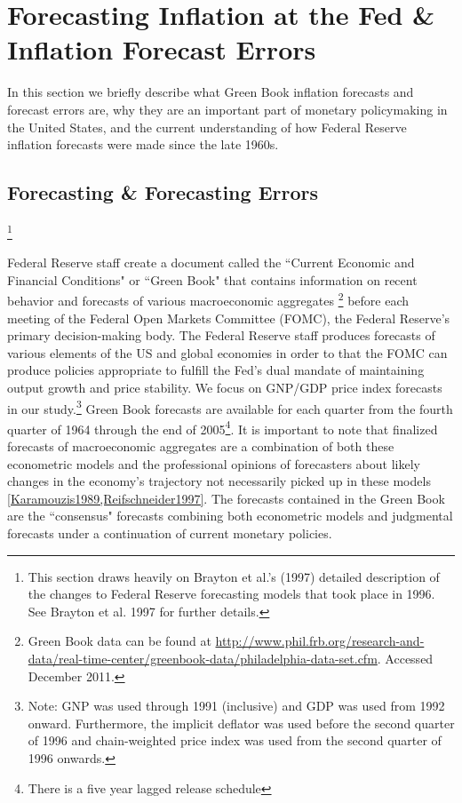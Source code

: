 \documentclass[a4paper]{article}\usepackage{graphicx, color}
\begin{document}

\section{Forecasting Inflation at the Fed \& Inflation Forecast Errors}

In this section we briefly describe what Green Book inflation forecasts and forecast errors are, why they are an important part of monetary policymaking in the United States, and the current understanding of how Federal Reserve inflation forecasts were made since the late 1960s.

\subsection{Forecasting \& Forecasting Errors}\footnote{This section draws heavily on Brayton et al.'s\nocite{Brayton1997} (1997) detailed description of the changes to Federal Reserve forecasting models that took place in 1996. See Brayton et al. 1997 for further details.}

Federal Reserve staff create a document called the ``Current Economic and Financial Conditions" or ``Green Book" that contains information on recent behavior and forecasts of various macroeconomic aggregates \footnote{Green Book data can be found at {\url{http://www.phil.frb.org/research-and-data/real-time-center/greenbook-data/philadelphia-data-set.cfm}}. Accessed December 2011.} before each meeting of the Federal Open Markets Committee (FOMC), the Federal Reserve's primary decision-making body. The Federal Reserve staff produces forecasts of various elements of the US and global economies in order to that the FOMC can produce policies appropriate to fulfill the Fed's dual mandate of maintaining output growth and price stability. We focus on GNP/GDP price index forecasts in our study.\footnote{Note: GNP was used through 1991 (inclusive) and GDP was used from 1992 onward. Furthermore, the implicit deflator was used before the second quarter of 1996 and chain-weighted price index was used from the second quarter of 1996 onwards.} Green Book forecasts are available for each quarter from the fourth quarter of 1964 through the end of 2005\footnote{There is a five year lagged release schedule}. It is important to note that finalized forecasts of macroeconomic aggregates are a combination of both these econometric models and the professional opinions of forecasters about likely changes in the economy's trajectory not necessarily picked up in these models \ref{Karamouzis1989,Reifschneider1997}. The forecasts contained in the Green Book are the ``consensus" forecasts combining both econometric models and judgmental forecasts under a continuation of current monetary policies.
\end{document}
